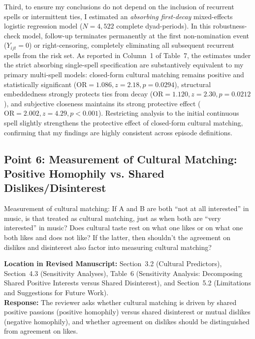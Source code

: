 \documentclass[11pt]{article}
\begin{document}
Third, to ensure my conclusions do not depend on the inclusion of recurrent spells or intermittent ties, I estimated an \textit{absorbing first-decay} mixed-effects logistic regression model ($N = 4,522$ complete dyad-periods). In this robustness-check model, follow-up terminates permanently at the first non-nomination event ($Y_{ijt} = 0$) or right-censoring, completely eliminating all subsequent recurrent spells from the risk set. As reported in Column~1 of Table~7, the estimates under the strict absorbing single-spell specification are substantively equivalent to my primary multi-spell models: closed-form cultural matching remains positive and statistically significant ($\text{OR} = 1.086, z = 2.18, p = 0.0294$), structural embeddedness strongly protects ties from decay ($\text{OR} = 1.120, z = 2.30, p = 0.0212$), and subjective closeness maintains its strong protective effect ($\text{OR} = 2.002, z = 4.29, p < 0.001$). Restricting analysis to the initial continuous spell slightly strengthens the protective effect of closed-form cultural matching, confirming that my findings are highly consistent across episode definitions.

\subsection*{Point 6: Measurement of Cultural Matching: Positive Homophily vs. Shared Dislikes/Disinterest}

\begin{reviewercomment}
Measurement of cultural matching: If A and B are both ``not at all interested'' in music, is that treated as cultural matching, just as when both are ``very interested'' in music? Does cultural taste rest on what one likes or on what one both likes and does not like? If the latter, then shouldn't the agreement on dislikes and disinterest also factor into measuring cultural matching?
\end{reviewercomment}

\noindent\textbf{Location in Revised Manuscript:} Section~3.2 (Cultural Predictors), Section~4.3 (Sensitivity Analyses), Table~6 (Sensitivity Analysis: Decomposing Shared Positive Interests versus Shared Disinterest), and Section~5.2 (Limitations and Suggestions for Future Work).\\[4pt]
\textbf{Response:} The reviewer asks whether cultural matching is driven by shared positive passions (positive homophily) versus shared disinterest or mutual dislikes (negative homophily), and whether agreement on dislikes should be distinguished from agreement on likes.
\end{document}
